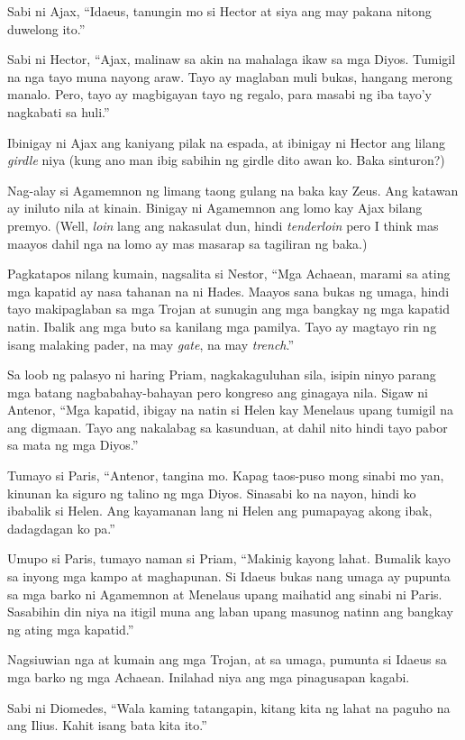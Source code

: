 \documentclass[12pt,letterpaper]{report}
\begin{document}
Sabi ni Ajax, ``Idaeus, tanungin mo si Hector at siya ang may pakana nitong duwelong ito.''

Sabi ni Hector, ``Ajax, malinaw sa akin na mahalaga ikaw sa mga Diyos. Tumigil na nga tayo muna nayong araw. Tayo ay maglaban muli bukas, hangang merong manalo. Pero, tayo ay magbigayan tayo ng regalo, para masabi ng iba tayo'y nagkabati sa huli.''

Ibinigay ni Ajax ang kaniyang pilak na espada, at ibinigay ni Hector ang lilang \textit{girdle} niya (kung ano man ibig sabihin ng girdle dito awan ko. Baka sinturon?)

Nag-alay si Agamemnon ng limang taong gulang na baka kay Zeus. Ang katawan ay iniluto nila at kinain. Binigay ni Agamemnon ang lomo kay Ajax bilang premyo. (Well, \textit{loin} lang ang nakasulat dun, hindi \textit{tenderloin} pero I think mas maayos dahil nga na lomo ay mas masarap sa tagiliran ng baka.)

Pagkatapos nilang kumain, nagsalita si Nestor, ``Mga Achaean, marami sa ating mga kapatid ay nasa tahanan na ni Hades. Maayos sana bukas ng umaga, hindi tayo makipaglaban sa mga Trojan at sunugin ang mga bangkay ng mga kapatid natin. Ibalik ang mga buto sa kanilang mga pamilya. Tayo ay magtayo rin ng isang malaking pader, na may \textit{gate}, na may \textit{trench}.''

Sa loob ng palasyo ni haring Priam, nagkakaguluhan sila, isipin ninyo parang mga batang nagbabahay-bahayan pero kongreso ang ginagaya nila. Sigaw ni Antenor, ``Mga kapatid, ibigay na natin si Helen kay Menelaus upang tumigil na ang digmaan. Tayo ang nakalabag sa kasunduan, at dahil nito hindi tayo pabor sa mata ng mga Diyos.''

Tumayo si Paris, ``Antenor, tangina mo. Kapag taos-puso mong sinabi mo yan, kinunan ka siguro ng talino ng mga Diyos. Sinasabi ko na nayon, hindi ko ibabalik si Helen. Ang kayamanan lang ni Helen ang pumapayag akong ibak, dadagdagan ko pa.''

Umupo si Paris, tumayo naman si Priam, ``Makinig kayong lahat. Bumalik kayo sa inyong mga kampo at maghapunan. Si Idaeus bukas nang umaga ay pupunta sa mga barko ni Agamemnon at Menelaus upang maihatid ang sinabi ni Paris. Sasabihin din niya na itigil muna ang laban upang masunog natinn ang bangkay ng ating mga kapatid.''

Nagsiuwian nga at kumain ang mga Trojan, at sa umaga, pumunta si Idaeus sa mga barko ng mga Achaean. Inilahad niya ang mga pinagusapan kagabi.

Sabi ni Diomedes, ``Wala kaming tatangapin, kitang kita ng lahat na paguho na ang Ilius. Kahit isang bata kita ito.''
\end{document}
